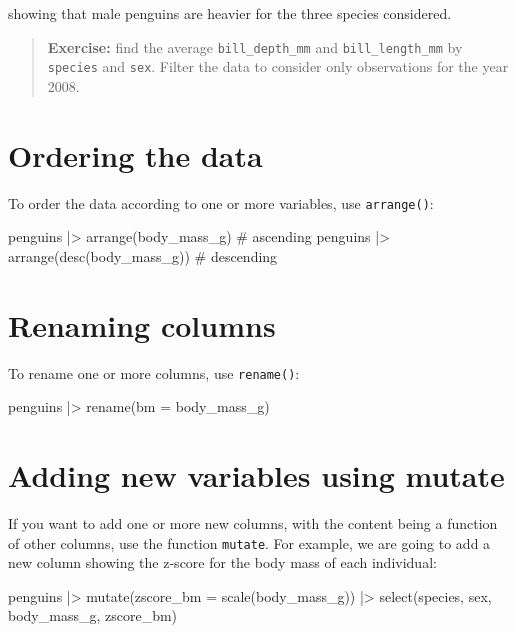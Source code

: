 \documentclass[
  letterpaper,
  DIV=11,
  numbers=noendperiod]{scrreprt}
\newenvironment{Shaded}{\begin{snugshade}}{\end{snugshade}}
\newcommand{\NormalTok}[1]{\textcolor[rgb]{0.00,0.23,0.31}{#1}}
\begin{document}
showing that male penguins are heavier for the three species considered.

\begin{quote}
\textbf{Exercise:} find the average \texttt{bill\_depth\_mm} and
\texttt{bill\_length\_mm} by \texttt{species} and \texttt{sex}. Filter
the data to consider only observations for the year 2008.
\end{quote}

\section{Ordering the data}\label{ordering-the-data}

To order the data according to one or more variables, use
\texttt{arrange()}:

\begin{Shaded}
\begin{Highlighting}[]
\NormalTok{penguins |\textgreater{} }
\NormalTok{  arrange(body\_mass\_g) \# ascending}
\NormalTok{penguins |\textgreater{} }
\NormalTok{  arrange(desc(body\_mass\_g)) \# descending}
\end{Highlighting}
\end{Shaded}

\section{Renaming columns}\label{renaming-columns}

To rename one or more columns, use \texttt{rename()}:

\begin{Shaded}
\begin{Highlighting}[]
\NormalTok{penguins |\textgreater{} }
\NormalTok{  rename(bm = body\_mass\_g)}
\end{Highlighting}
\end{Shaded}

\section{Adding new variables using
mutate}\label{adding-new-variables-using-mutate}

If you want to add one or more new columns, with the content being a
function of other columns, use the function \texttt{mutate}. For
example, we are going to add a new column showing the z-score for the
body mass of each individual:

\begin{Shaded}
\begin{Highlighting}[]
\NormalTok{penguins |\textgreater{} }
\NormalTok{  mutate(zscore\_bm = scale(body\_mass\_g)) |\textgreater{} }
\NormalTok{  select(species, sex, body\_mass\_g, zscore\_bm)}
\end{Highlighting}
\end{Shaded}
\end{document}
